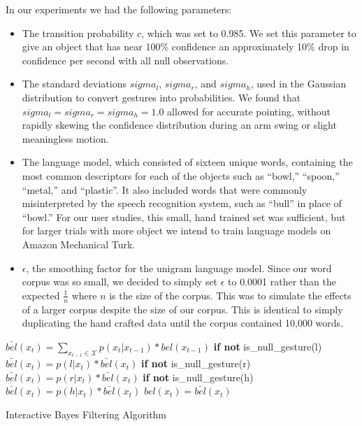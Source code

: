 \documentclass[a4paper, 11pt]{article} %
\begin{document}
In our experiments we had the following parameters:\begin{itemize}
\item The transition probability $c$, which was set to 0.985. We set this parameter to give an object that has near 100\% confidence an approximately 10\% drop in confidence per second with all null observations.
\item The standard deviations $sigma_l$, $sigma_r$, and $sigma_h$, used in the Gaussian distribution to convert gestures into probabilities. We found that $sigma_l = sigma_r = sigma_h = 1.0$ allowed for accurate pointing, without rapidly skewing the confidence distribution during an arm swing or slight meaningless motion.
\item The language model, which consisted of sixteen unique words, containing the most common descriptors for each of the objects such as ``bowl,'' ``spoon,'' ``metal,'' and ``plastic''. It also included words that were commonly misinterpreted by the speech recognition system, such as ``bull'' in place of ``bowl.'' For our user studies, this small, hand trained set was sufficient, but for larger trials with more object we intend to train language models on Amazon Mechanical Turk.
\item $\epsilon$, the smoothing factor for the unigram language model. Since our word corpus was so small, we decided to simply set $\epsilon$ to 0.0001 rather than the expected $\frac{1}{n}$ where $n$ is the size of the corpus. This was to simulate the effects of a larger corpus despite the size of our corpus. This is identical to simply duplicating the hand crafted data until the corpus contained 10,000 words.
\end{itemize}
\begin{algorithm}
    \DontPrintSemicolon
    \BlankLine
    \BlankLine
     {
      $\bar{bel}(x_t) = \displaystyle\sum_{x_{t-1} \in \mathcal{X}} p(x_t|x_{t-1})*bel(x_{t-1})$
      \BlankLine
      \textbf{if not} is\_null\_gesture(l)
      \BlankLine
      \Indp$\bar{bel}(x_t) = p(l | x_t) *  \bar{bel}(x_t)$
      \BlankLine
      \Indm\textbf{if not} is\_null\_gesture(r)
      \BlankLine
      \Indp$\bar{bel}(x_t) = p(r | x_t) *  \bar{bel}(x_t)$
      \BlankLine
      \Indm\textbf{if not} is\_null\_gesture(h)
      \BlankLine
      \Indp$\bar{bel}(x_t) = p(h | x_t) *  \bar{bel}(x_t)$
      \BlankLine
      \Indm{}
      $bel(x_t) = \bar{bel}(x_t)$
    }
    \BlankLine
\caption{Interactive Bayes Filtering Algorithm} 
\label{alg:algorithm}
\end{algorithm}
\end{document}
